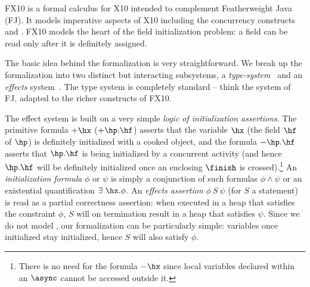 FX10 is a formal calculus for X10 intended to  complement Featherweight Java
(FJ).  It models imperative aspects of X10 including the concurrency
constructs \finish{} and \async{}.
FX10 models the heart of the field initialization problem:
    a field can be read only after it  is definitely assigned.


The basic idea behind the formalization is very straightforward. We
break up the formalization into two distinct but interacting
subsystems, a {\em type-system}~ and an {\em
  effects} system~. The type
system is completely standard -- think the system of FJ, adapted to
the richer constructs of FX10.

The effect system is built on a very simple {\em logic of
  initialization assertions}.  The primitive formula $+\hx$
($+\hp.\hf$) asserts that the variable $\hx$ (the field $\hf$ of
$\hp$) is definitely initialized with a cooked object, and the formula
$-\hp.\hf$ asserts that $\hp.\hf$ is being initialized by a concurrent
activity (and hence $\hp.\hf$ will be definitely initialized once an
enclosing $\finish$ is crossed).\footnote{There is no need for the
  formula $-\hx$ since local variables declared within an $\async$
  cannot be accessed outside it.}  An {\em initialization formula}
$\phi$ or $\psi$ is simply a conjunction of such formulas $\phi \wedge
\psi$ or an existential quantification $\exists{}~\hx.\phi$.
An {\em
  effects assertion} $\phi~S~\psi$ (for $S$ a statement) is read as a
partial correctness assertion: when executed in a heap that satisfies
the constraint $\phi$, $S$ will on termination result in a heap that
satisfies $\psi$.  Since we do not model , our
formalization can be particularly simple: variables once initialized
stay initialized, hence $S$ will also satisfy $\phi$.

